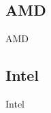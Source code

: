 \documentclass[graphics]{beamer}
\begin{document}
\subsection{AMD}
\begin{frame}{AMD}
\end{frame}

\subsection{Intel}
\begin{frame}{Intel}
\end{frame}
\end{document}
